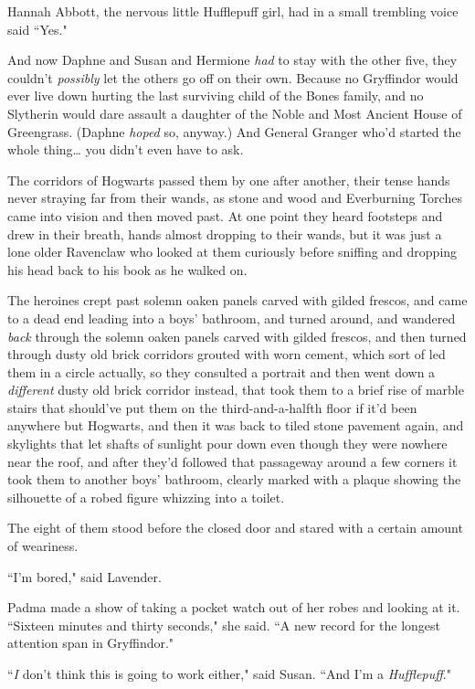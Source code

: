 Hannah Abbott, the nervous little Hufflepuff girl, had in a small trembling voice said ``Yes."

And now Daphne and Susan and Hermione \emph{had} to stay with the other five, they couldn't \emph{possibly} let the others go off on their own. Because no Gryffindor would ever live down hurting the last surviving child of the Bones family, and no Slytherin would dare assault a daughter of the Noble and Most Ancient House of Greengrass. (Daphne \emph{hoped} so, anyway.) And General Granger who'd started the whole thing{\ldots} you didn't even have to ask.

The corridors of Hogwarts passed them by one after another, their tense hands never straying far from their wands, as stone and wood and Everburning Torches came into vision and then moved past. At one point they heard footsteps and drew in their breath, hands almost dropping to their wands, but it was just a lone older Ravenclaw who looked at them curiously before sniffing and dropping his head back to his book as he walked on.

The heroines crept past solemn oaken panels carved with gilded frescos, and came to a dead end leading into a boys' bathroom, and turned around, and wandered \emph{back} through the solemn oaken panels carved with gilded frescos, and then turned through dusty old brick corridors grouted with worn cement, which sort of led them in a circle actually, so they consulted a portrait and then went down a \emph{different} dusty old brick corridor instead, that took them to a brief rise of marble stairs that should've put them on the third-and-a-halfth floor if it'd been anywhere but Hogwarts, and then it was back to tiled stone pavement again, and skylights that let shafts of sunlight pour down even though they were nowhere near the roof, and after they'd followed that passageway around a few corners it took them to another boys' bathroom, clearly marked with a plaque showing the silhouette of a robed figure whizzing into a toilet.

The eight of them stood before the closed door and stared with a certain amount of weariness.

``I'm bored," said Lavender.

Padma made a show of taking a pocket watch out of her robes and looking at it. ``Sixteen minutes and thirty seconds," she said. ``A new record for the longest attention span in Gryffindor."

``\emph{I} don't think this is going to work either," said Susan. ``And I'm a \emph{Hufflepuff}."

